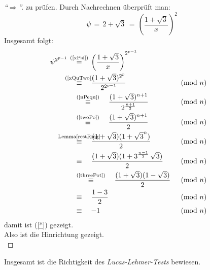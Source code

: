 \documentclass{article}
\begin{document}
\begin{proof}[``$\Rightarrow$'']
zu pr\"{u}fen.
Durch Nachrechnen \"{u}berpr\"{u}ft man:
\begin{equation}\label{xPsi}
	\psi \,= \,2+ \sqrt{3}\, = \,\left( \frac{1 + \sqrt{3}}{x} \right)^2
\end{equation}
Insgesamt folgt:
\begin{align*}
	 \psi^{2^{p-1}} \quad &\overset{\mathclap{\text{(\ref{xPsi})}}}{=} \quad \left( \frac{1 + \sqrt{3}}{x} \right)	^{2^{p-1}}\\
	 &\overset{\mathclap{\text{(\ref{xQuTwo})}}}{\equiv} \quad \frac{(1 + \sqrt{3})^{2^{p}}}{2^{2^{p-1}}} &&\pmod{n} \\
	 &\overset{\text{(\ref{nPequ})}}{\equiv} \quad \frac{(1 + \sqrt{3})^{n+1}}{2^{\frac{n+1}{2}}}&&\pmod{n}\\
	 &\overset{\text{(\ref{twoPo})}}{\equiv} \quad \frac{(1 + \sqrt{3})^{n+1}}{2} &&\pmod{n}\\
	 &\overset{\mathclap{\text{Lemma\ref{restRing}}}}{\equiv} \quad \frac{(1 + \sqrt{3})(1 + \sqrt{3}^{n})}{2} &&\pmod{n} \\
	 &\equiv \quad \frac{(1 + \sqrt{3})(1 + 3^{\frac{n-1}{2}}\,\sqrt{3})}{2} &&\pmod{n}\\
	 &\overset{\text{(\ref{threePot})}}{\equiv} \quad \frac{(1 + \sqrt{3})(1 - \sqrt{3})}{2} &&\pmod{n}\\
	 &\equiv \quad \frac{1 - 3}{2} &&\pmod{n}\\
	 &\equiv \quad -1 &&\pmod{n}
\end{align*}
damit ist (\ref{*}) gezeigt. \\Also ist die Hinrichtung gezeigt.\\
\end{proof}
Insgesamt ist die Richtigkeit des \emph{Lucas-Lehmer-Tests} bewiesen.
\newpage

\newpage


\end{document}
